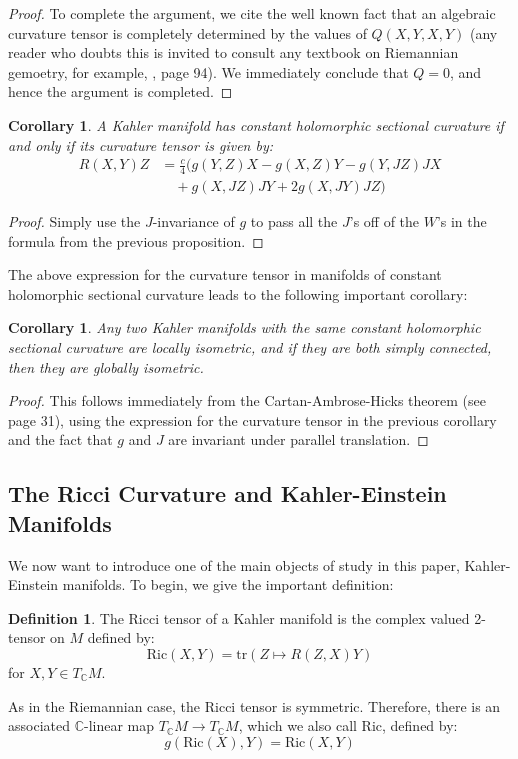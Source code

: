 \documentclass[11pt]{amsart}
\newtheorem{cor}[subsection]{Corollary}
\theoremstyle{definition}
\newtheorem{definition}[subsection]{Definition}
\def \C{ \mathbb{C} }
\def \Ric{ \text{Ric} }
\def \tr{ \text{tr} }
\begin{document}
\begin{proof}
To complete the argument, we cite the well known fact that an algebraic curvature tensor is completely determined by the values of $Q(X,Y,X,Y)$ (any reader who doubts this is invited to consult any textbook on Riemannian gemoetry, for example, \cite{dC}, page 94).  We immediately conclude that $Q = 0$, and hence the argument is completed.
%
\end{proof}

\begin{cor} A Kahler manifold has constant holomorphic sectional curvature if and only if its curvature tensor is given by:
%
\begin{align*}
R(X,Y)Z &= \frac{c}{4} (g(Y,Z)X - g(X,Z)Y - g(Y,JZ)JX  \\
& \quad + g(X, JZ)JY + 2 g(X,JY)JZ )
\end{align*}
%
\end{cor}

\begin{proof}  Simply use the $J$-invariance of $g$ to pass all the $J$'s off of the $W$'s in the formula from the previous proposition.
\end{proof}

The above expression for the curvature tensor in manifolds of constant holomorphic sectional curvature leads to the following important corollary:

\begin{cor} Any two Kahler manifolds with the same constant holomorphic sectional curvature are locally isometric, and if they are both simply connected, then they are globally isometric.
\end{cor}

\begin{proof} This follows immediately from the Cartan-Ambrose-Hicks theorem (see \cite{CE} page 31), using the expression for the curvature tensor in the previous corollary and the fact that $g$ and $J$ are invariant under parallel translation.
\end{proof}

\subsection{ The Ricci Curvature and Kahler-Einstein Manifolds }

We now want to introduce one of the main objects of study in this paper, Kahler-Einstein manifolds.  To begin, we give the important definition:
%
\begin{definition} The Ricci tensor of a Kahler manifold is the complex valued 2-tensor on $M$ defined by:
$$ \Ric (X, Y) = \tr( Z \mapsto R(Z,X)Y )$$
for $X,Y \in T_{\C} M$.
\end{definition}
%
As in the Riemannian case, the Ricci tensor is symmetric.  Therefore, there is an associated $\C$-linear map $T_{\C} M \rightarrow T_{\C} M$, which we also call $\Ric$, defined by:
%
$$ g( \Ric (X), Y ) = \Ric ( X, Y ) $$
\end{document}
